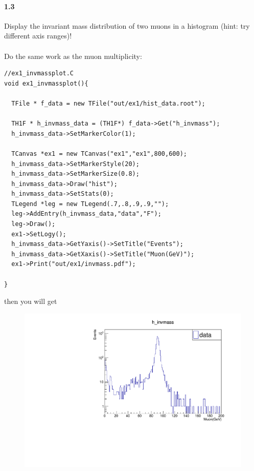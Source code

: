 \documentclass[11pt]{article}
\begin{document}
\paragraph{1.3}
Display the invariant mass distribution of two muons in a histogram (hint: try different axis ranges)!\\\\
Do the same work as the muon multiplicity:
\begin{lstlisting}[emph={if,while,continue,new},emphstyle=\color{nut}]
//ex1_invmassplot.C
void ex1_invmassplot(){

  TFile * f_data = new TFile("out/ex1/hist_data.root");

  TH1F * h_invmass_data = (TH1F*) f_data->Get("h_invmass");
  h_invmass_data->SetMarkerColor(1);

  TCanvas *ex1 = new TCanvas("ex1","ex1",800,600);
  h_invmass_data->SetMarkerStyle(20);
  h_invmass_data->SetMarkerSize(0.8);
  h_invmass_data->Draw("hist");
  h_invmass_data->SetStats(0);
  TLegend *leg = new TLegend(.7,.8,.9,.9,"");
  leg->AddEntry(h_invmass_data,"data","F");
  leg->Draw();
  ex1->SetLogy();
  h_invmass_data->GetYaxis()->SetTitle("Events");
  h_invmass_data->GetXaxis()->SetTitle("Muon(GeV)");
  ex1->Print("out/ex1/invmass.pdf");

}
\end{lstlisting}
then you will get
\begin{figure}[h]
\centering
\includegraphics[width=15cm]{invmass_data.pdf}
\end{figure}

\newpage
\end{document}
